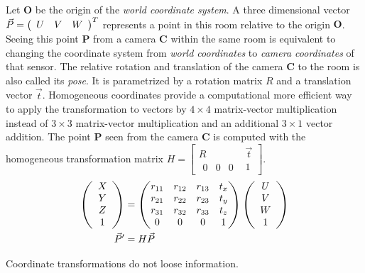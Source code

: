 Let $\mathbf{O}$ be the origin of the \emph{world coordinate system}.
A three dimensional vector $\vec{P} = \left(\begin{array}{ccc} U & V & W \end{array}\right)^T$ represents a point in this room relative to the origin $\mathbf{O}$.
Seeing this point $\mathbf{P}$ from a camera $\mathbf{C}$ within the same room is equivalent to changing the coordinate system from \emph{world coordinates} to \emph{camera coordinates} of that sensor.
The relative rotation and translation of the camera $\mathbf{C}$ to the room is also called its \emph{pose}.
It is parametrized by a rotation matrix $R$ and a translation vector $\vec{t}$.
Homogeneous coordinates provide a computational more efficient way to apply the transformation to vectors by $4 \times 4$ matrix-vector multiplication instead of $3 \times 3$ matrix-vector multiplication and an additional $3 \times 1$ vector addition.
The point $\mathbf{P}$ seen from the camera $\mathbf{C}$ is computed with the homogeneous transformation matrix $H = \begin{bmatrix} R & \vec{t} \\ 
    \begin{matrix}0 & 0 & 0\end{matrix} & 1 \end{bmatrix}$.
\begin{equation}
\begin{aligned}
    \left(\begin{array}{c} X \\ Y \\ Z \\ 1\end{array}\right)&= \begin{pmatrix}
        r_{11} & r_{12} & r_{13} & t_x \\
        r_{21} & r_{22} & r_{23} & t_y \\
        r_{31} & r_{32} & r_{33} & t_z \\
        0      & 0      & 0      & 1 \\
    \end{pmatrix} \left(\begin{array}{c} U \\ V \\ W \\ 1\end{array}\right) \\
    \vec{P}' &= H \vec{P}
\end{aligned}
\end{equation}

Coordinate transformations do not loose information.
